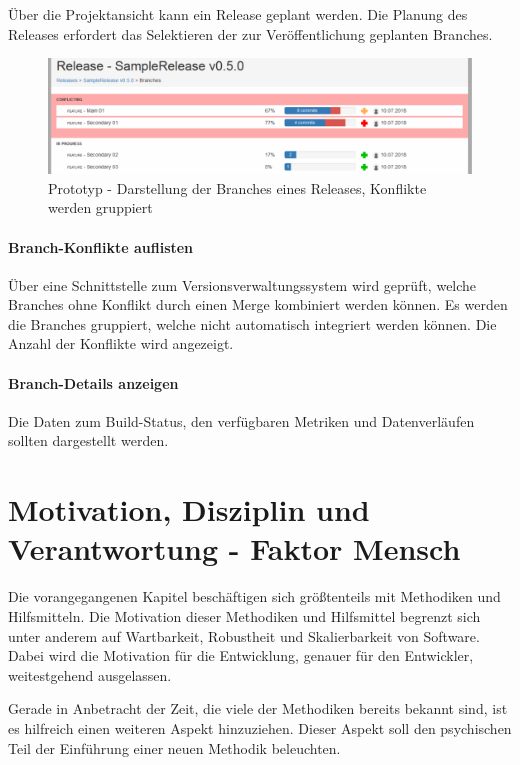 Über die Projektansicht kann ein Release geplant werden. Die Planung des Releases erfordert das Selektieren der zur Veröffentlichung geplanten Branches.

\begin{figure}[h]
  \includegraphics[width=\textwidth, height=\textheight, keepaspectratio]
  {resources/prototype-release-show-branches.pdf}
  \caption{Prototyp - Darstellung der Branches eines Releases, Konflikte werden gruppiert}
  \label{prototype-release-show-branches}
\end{figure}

\paragraph{Branch-Konflikte auflisten}

Über eine Schnittstelle zum Versionsverwaltungssystem wird geprüft, welche Branches ohne Konflikt durch einen Merge kombiniert werden können. Es werden die Branches gruppiert, welche nicht automatisch integriert werden können. Die Anzahl der Konflikte wird angezeigt.

\paragraph{Branch-Details anzeigen}

Die Daten zum Build-Status, den verfügbaren Metriken und Datenverläufen sollten dargestellt werden.

\section{Motivation, Disziplin und Verantwortung - Faktor Mensch}
\label{sec:human-fail}
Die vorangegangenen Kapitel beschäftigen sich größtenteils mit Methodiken und Hilfsmitteln. Die Motivation dieser Methodiken und Hilfsmittel begrenzt sich unter anderem auf Wartbarkeit, Robustheit und Skalierbarkeit von Software. Dabei wird die Motivation für die Entwicklung, genauer für den Entwickler, weitestgehend ausgelassen.

Gerade in Anbetracht der Zeit, die viele der Methodiken bereits bekannt sind, ist es hilfreich einen weiteren Aspekt hinzuziehen. Dieser Aspekt soll den psychischen Teil der Einführung einer neuen Methodik beleuchten.

